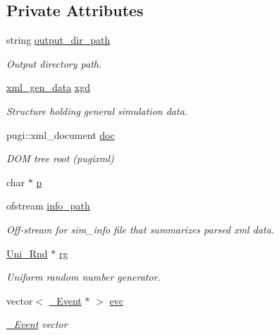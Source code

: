 \subsection*{Private Attributes}
\begin{DoxyCompactItemize}
\item 
string \hyperlink{classnw_1_1_standard___ipt_a22ca09b593a0438676fd560f168e76f9}{output\+\_\+dir\+\_\+path}
\begin{DoxyCompactList}\small\item\em Output directory path. \end{DoxyCompactList}\item 
\hyperlink{structnw_1_1_standard___ipt_1_1xml__gen__data}{xml\+\_\+gen\+\_\+data} \hyperlink{classnw_1_1_standard___ipt_aad5708d9729b7a5f660dade1927b4d4e}{xgd}
\begin{DoxyCompactList}\small\item\em Structure holding general simulation data. \end{DoxyCompactList}\item 
pugi\+::xml\+\_\+document \hyperlink{classnw_1_1_standard___ipt_a08140c2c24ab36240c45d241352fc57d}{doc}
\begin{DoxyCompactList}\small\item\em D\+O\+M tree root (pugixml) \end{DoxyCompactList}\item 
char $\ast$ \hyperlink{classnw_1_1_standard___ipt_af30a47d8999101d9f83964b5be9f86a5}{p}
\item 
ofstream \hyperlink{classnw_1_1_standard___ipt_a7b8147e8b90f4adabb30e1b3fd8c40b8}{info\+\_\+path}
\begin{DoxyCompactList}\small\item\em Off-\/stream for sim\+\_\+info file that summarizes parsed xml data. \end{DoxyCompactList}\item 
\hyperlink{classnw_1_1_uni___rnd}{Uni\+\_\+\+Rnd} $\ast$ \hyperlink{classnw_1_1_standard___ipt_a18f5e3cad0d5eef81443dfaf8949ba4b}{rg}
\begin{DoxyCompactList}\small\item\em Uniform random number generator. \end{DoxyCompactList}\item 
vector$<$ \hyperlink{classnw_1_1___event}{\+\_\+\+Event} $\ast$ $>$ \hyperlink{classnw_1_1_standard___ipt_aed79f0ae61a44f1d3aceb6839a8a7733}{evc}
\begin{DoxyCompactList}\small\item\em \hyperlink{classnw_1_1___event}{\+\_\+\+Event} vector \end{DoxyCompactList}\item 

\end{DoxyCompactItemize}
